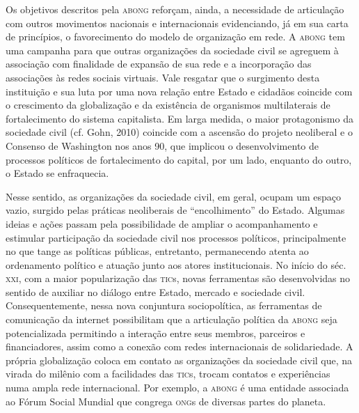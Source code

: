 Os objetivos descritos pela \textsc{abong} reforçam, ainda, a necessidade de
articulação com outros movimentos nacionais e internacionais
evidenciando, já em sua carta de princípios, o favorecimento do modelo
de organização em rede. A \textsc{abong} tem uma campanha para que outras
organizações da sociedade civil se agreguem à associação com finalidade
de expansão de sua rede e a incorporação das associações às redes
sociais virtuais. Vale resgatar que o surgimento desta instituição e sua
luta por uma nova relação entre Estado e cidadãos coincide com o
crescimento da globalização e da existência de organismos multilaterais
de fortalecimento do sistema capitalista. Em larga medida, o maior
protagonismo da sociedade civil (cf. Gohn, 2010) coincide com a ascensão
do projeto neoliberal e o Consenso de Washington nos anos 90, que
implicou o desenvolvimento de processos políticos de fortalecimento do
capital, por um lado, enquanto do outro, o Estado se enfraquecia.

Nesse sentido, as organizações da sociedade civil, em geral, ocupam um
espaço vazio, surgido pelas práticas neoliberais de ``encolhimento'' do
Estado. Algumas ideias e ações passam pela possibilidade de ampliar o
acompanhamento e estimular participação da sociedade civil nos processos
políticos, principalmente no que tange as políticas públicas,
entretanto, permanecendo atenta ao ordenamento político e atuação junto
aos atores institucionais. No início do séc. \textsc{xxi}, com a maior
popularização das \textsc{tic}s, novas ferramentas são desenvolvidas no sentido
de auxiliar no diálogo entre Estado, mercado e sociedade civil.
Consequentemente, nessa nova conjuntura sociopolítica, as ferramentas de
comunicação da internet possibilitam que a articulação política da \textsc{abong}
seja potencializada permitindo a interação entre seus membros, parceiros
e financiadores, assim como a conexão com redes internacionais de
solidariedade. A própria globalização coloca em contato as organizações
da sociedade civil que, na virada do milênio com a facilidades das \textsc{tic}s,
trocam contatos e experiências numa ampla rede internacional. Por
exemplo, a \textsc{abong} é uma entidade associada ao Fórum Social Mundial que
congrega \textsc{ong}s de diversas partes do planeta.

